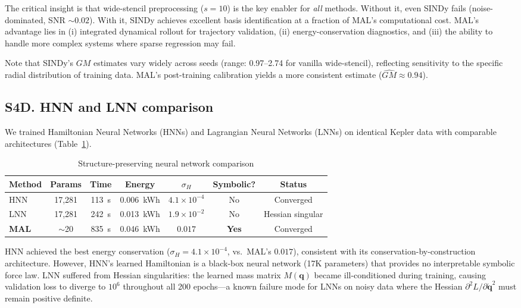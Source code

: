 \documentclass[aps,pre,reprint,superscriptaddress]{revtex4-2}
\begin{document}
The critical insight is that wide-stencil preprocessing ($s=10$) is the key enabler for \textit{all} methods. Without it, even SINDy fails (noise-dominated, SNR $\sim 0.02$). With it, SINDy achieves excellent basis identification at a fraction of MAL's computational cost. MAL's advantage lies in (i) integrated dynamical rollout for trajectory validation, (ii) energy-conservation diagnostics, and (iii) the ability to handle more complex systems where sparse regression may fail.

Note that SINDy's $GM$ estimates vary widely across seeds (range: 0.97--2.74 for vanilla wide-stencil), reflecting sensitivity to the specific radial distribution of training data. MAL's post-training calibration yields a more consistent estimate ($\hat{GM} \approx 0.94$).

\subsection{S4D. HNN and LNN comparison}
We trained Hamiltonian Neural Networks (HNNs) \cite{Greydanus2019} and Lagrangian Neural Networks (LNNs) \cite{Cranmer2020LNN} on identical Kepler data with comparable architectures (Table~\ref{tab:hnn-lnn-si}).

\begin{table}[!ht]
\centering
\caption{Structure-preserving neural network comparison}
\label{tab:hnn-lnn-si}
\small
\begin{tabular}{lcccccc}
\hline
Method & Params & Time & Energy & $\sigma_H$ & Symbolic? & Status \\
\hline
HNN & 17,281 & 113~s & 0.006~kWh & $4.1 \times 10^{-4}$ & No & Converged \\
LNN & 17,281 & 242~s & 0.013~kWh & $1.9 \times 10^{-2}$ & No & Hessian singular \\
\textbf{MAL} & $\sim$20 & 835~s & 0.046~kWh & $0.017$ & \textbf{Yes} & Converged \\
\hline
\end{tabular}
\end{table}

HNN achieved the best energy conservation ($\sigma_H = 4.1 \times 10^{-4}$, vs.\ MAL's $0.017$), consistent with its conservation-by-construction architecture. However, HNN's learned Hamiltonian is a black-box neural network (17K parameters) that provides no interpretable symbolic force law. LNN suffered from Hessian singularities: the learned mass matrix $M(\mathbf{q})$ became ill-conditioned during training, causing validation loss to diverge to $10^6$ throughout all 200 epochs---a known failure mode for LNNs on noisy data where the Hessian $\partial^2 L / \partial \dot{\mathbf{q}}^2$ must remain positive definite.
\end{document}
